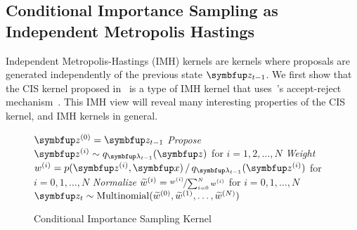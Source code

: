 %
\subsection{Conditional Importance Sampling as Independent Metropolis Hastings}\label{section:cis_imh}
Independent Metropolis-Hastings (IMH) kernels are kernels where proposals are generated independently of the previous state \(\vz_{t-1}\).
We first show that the CIS kernel proposed in~\citep{NEURIPS2020_b2070693} is a type of IMH kernel that uses~\citeauthor{barker_monte_1965}'s accept-reject mechanism~\citep{barker_monte_1965}.
This IMH view will reveal many interesting properties of the CIS kernel, and IMH kernels in general.


\begin{figure}
  \begin{algorithm2e}[H]
    \DontPrintSemicolon
    \SetAlgoLined
    \(\vz^{(0)} = \vz_{t-1}\) \;
    \textit{Propose} \(\vz^{(i)} \sim q_{\vlambda_{t-1}}(\vz)\) for \(i = 1, 2,\ldots, N\) \;
    \textit{Weight} \(w^{(i)} = p(\vz^{(i)},\vx) \,/\, q_{\vlambda_{t-1}}(\vz^{(i)}) \) for \(i = 0, 1,\ldots, N\)\;
    \textit{Normalize} \(\widetilde{w}^{(i)} = \nicefrac{w^{(i)}}{ \sum^{N}_{i=0} w^{(i)} }\) for \(i = 0, 1,\ldots, N\)\;
    \(\vz_{t} \sim \mathrm{Multinomial}(\widetilde{w}^{(0)}, \widetilde{w}^{(1)}, \ldots, \widetilde{w}^{(N)}) \)\;
    \caption{Conditional Importance Sampling Kernel}\label{alg:cis}
  \end{algorithm2e}
\end{figure}
%
